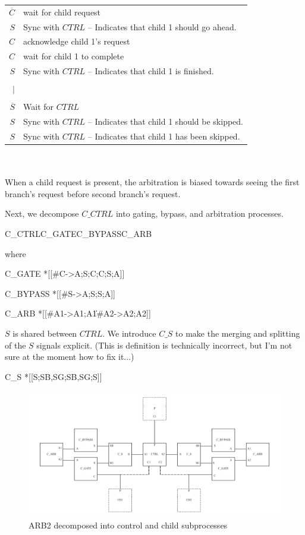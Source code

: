 \documentclass[aer.tex]{subfiles}
\begin{document}
\begin{tabular}[]{rl}
  $\overline{C}$ & wait for child request \\
  $S$ & Sync with $CTRL$ -- Indicates that child 1 should go ahead. \\
  $C$ & acknowledge child 1's request \\
  $C$ & wait for child 1 to complete \\
  $S$ & Sync with $CTRL$ -- Indicates that child 1 is finished. \\ \\
  $\vert$ & \\ \\
  $\overline{S}$ & Wait for $CTRL$ \\
  $S$ & Sync with $CTRL$ -- Indicates that child 1 should be skipped. \\
  $S$ & Sync with $CTRL$ -- Indicates that child 1 has been skipped. \\
\end{tabular} \\ \\

\noindent When a child request is present, the arbitration is biased towards seeing
the first branch's request before second branch's request.

Next, we decompose $C\_CTRL$ into gating, bypass, and arbitration processes. 

\begin{csp}
C_CTRL\equiv\!C_GATE\pll\!C_BYPASS\pll\!C_ARB
\end{csp}

\noindent where

\begin{csp}
C_GATE\equiv
  *[[#{C}->A;S;C;C;S;A]]

C_BYPASS\equiv
  *[[#{S}->A;S;S;A]]

C_ARB\equiv
  *[[#{A1}->A1;A1\|#{A2}->A2;A2]]
\end{csp}

\noindent $S$ is shared between $CTRL$. 
We introduce $C\_S$ to make the merging and splitting of the $S$ signals explicit.
(This is definition is technically incorrect, but I'm not sure at the moment how to fix it...)

\begin{csp}
C_S\equiv
  *[[S;SB,SG;SB,SG;S]]
\end{csp}

\begin{figure}
  \centering  
  \includegraphics[width=.8\textwidth]{img/transmitter/arb.pdf}
  \caption{ARB2 decomposed into control and child subprocesses}
  \label{fig:arb2_decomp}
\end{figure}
\end{document}
